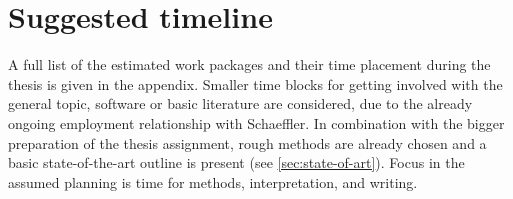 
\chapter{Suggested timeline}
A full list of the estimated work packages and their time placement during the thesis is given in the appendix. Smaller time blocks for getting involved with the general topic, software or basic literature are considered, due to the already ongoing employment relationship with Schaeffler. In combination with the bigger preparation of the thesis assignment, rough methods are already chosen and a basic state-of-the-art outline is present (see \autoref{sec:state-of-art}). Focus in the assumed planning is time for methods, interpretation, and writing.

